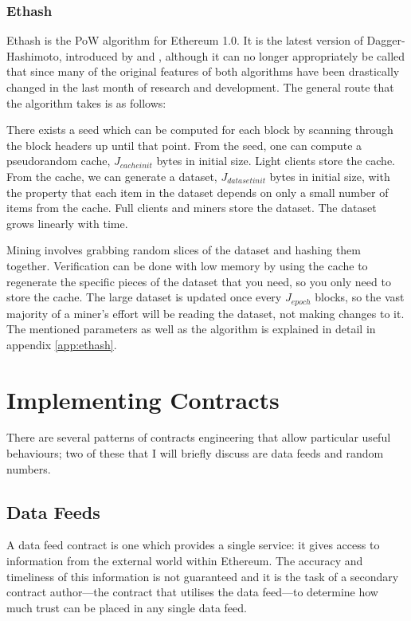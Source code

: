 \documentclass[9pt,oneside]{amsart}
\begin{document}
\begin{multicols}{2}
\subsubsection{Ethash}
Ethash is the PoW algorithm for Ethereum 1.0. It is the latest version of Dagger-Hashimoto, introduced by \cite{dagger} and \cite{hashimoto}, although it can no longer appropriately be called that since many of the original features of both algorithms have been drastically changed in the last month of research and development. The general route that the algorithm takes is as follows:

There exists a seed which can be computed for each block by scanning through the block headers up until that point. From the seed, one can compute a pseudorandom cache, $J_{cacheinit}$ bytes in initial size. Light clients store the cache. From the cache, we can generate a dataset, $J_{datasetinit}$ bytes in initial size, with the property that each item in the dataset depends on only a small number of items from the cache. Full clients and miners store the dataset. The dataset grows linearly with time.

Mining involves grabbing random slices of the dataset and hashing them together. Verification can be done with low memory by using the cache to regenerate the specific pieces of the dataset that you need, so you only need to store the cache. The large dataset is updated once every $J_{epoch}$ blocks, so the vast majority of a miner's effort will be reading the dataset, not making changes to it. The mentioned parameters as well as the algorithm is explained in detail in appendix \ref{app:ethash}.

\section{Implementing Contracts}

There are several patterns of contracts engineering that allow particular useful behaviours; two of these that I will briefly discuss are data feeds and random numbers.

\subsection{Data Feeds}
A data feed contract is one which provides a single service: it gives access to information from the external world within Ethereum. The accuracy and timeliness of this information is not guaranteed and it is the task of a secondary contract author---the contract that utilises the data feed---to determine how much trust can be placed in any single data feed.


\end{multicols}
\end{document}
